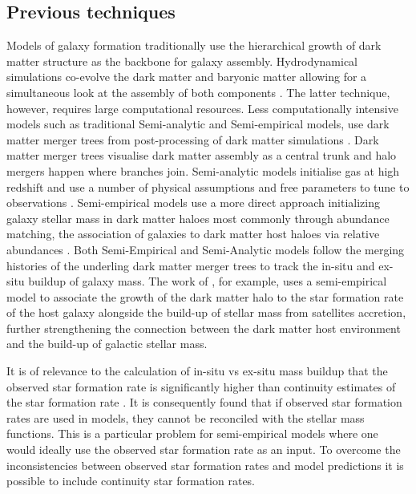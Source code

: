 \subsection{Previous techniques}

Models of galaxy formation traditionally use the hierarchical growth of dark matter structure as the backbone for galaxy assembly. Hydrodynamical simulations co-evolve the dark matter and baryonic matter allowing for a simultaneous look at the assembly of both components \citep{McAlpine2015TheCatalogues,Vogelsberger2014IntroducingUniverse}. The latter technique, however, requires large computational resources. Less computationally intensive models such as traditional Semi-analytic and Semi-empirical models, use dark matter merger trees from post-processing of dark matter simulations \citep{Guo2011FromCosmology, Shankar2013}. Dark matter merger trees visualise dark matter assembly as a central trunk and halo mergers happen where branches join. Semi-analytic models initialise gas at high redshift and use a number of physical assumptions and free parameters to tune to observations \citep{DeLucia2006TheGalaxies, Guo2011FromCosmology}. Semi-empirical models use a more direct approach initializing galaxy stellar mass in dark matter haloes most commonly through abundance matching, the association of galaxies to dark matter host haloes via relative abundances \citep{Hopkins2010MERGERSMATTER, Zavala2012, Moster2013, Shankar2014, Moster2018Emerge10}. Both Semi-Empirical and Semi-Analytic models follow the merging histories of the underling dark matter merger trees to track the in-situ and ex-situ buildup of galaxy mass. The work of \citet{Moster2018Emerge10}, for example, uses a semi-empirical model to associate the growth of the dark matter halo to the star formation rate of the host galaxy alongside the build-up of stellar mass from satellites accretion, further strengthening the connection between the dark matter host environment and the build-up of galactic stellar mass.


It is of relevance to the calculation of in-situ vs ex-situ mass buildup that the observed star formation rate is significantly higher than continuity estimates of the star formation rate \citep[e.g.][]{Leja2015ReconcilingFunction, Lapi2017StellarEquation}. It is consequently found that if observed star formation rates are used in models, they cannot be reconciled with the stellar mass functions. This is a particular problem for semi-empirical models where one would ideally use the observed star formation rate as an input. To overcome the inconsistencies between observed star formation rates and model predictions it is possible to include continuity star formation rates.


